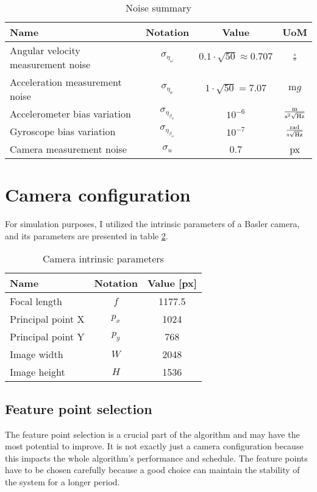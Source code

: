 \begin{table}[!ht]
    \centering
    \begin{tabular}{l|c|c|c}
         Name & Notation & Value & UoM \\ \hline
         Angular velocity measurement noise & $\sigma_{\eta_\omega}$ & $0.1\cdot\sqrt{50}\approx 0.707$ & $\si{\frac{\circ}{\second}}$ \\
         Acceleration measurement noise & $\sigma_{\eta_a}$ & $1\cdot\sqrt{50}=7.07$ & $\si{\milli g}$ \\
         Accelerometer bias variation & $\sigma_{\eta_{\beta_a}}$ & $10^{-6}$ & $\si{\frac{\meter}{\second\squared\sqrt{\hertz}}}$ \\
         Gyroscope bias variation & $\sigma_{\eta_{\beta_\omega}}$ & $10^{-7}$ & $\si{\frac{\radian}{\second\sqrt{\hertz}}}$ \\
         Camera measurement noise & $\sigma_u$ & 0.7 & \si{px}
    \end{tabular}
    \caption{Noise summary}
    \label{tab:noises}
\end{table}

\section{Camera configuration}

For simulation purposes, I utilized the intrinsic parameters of a Basler camera, and its parameters are presented in table \ref{tab:cam-intrinsic}.
\begin{table}[!ht]
    \centering
    \begin{tabular}{l|c|c}
         Name & Notation & Value [px] \\ \hline
         Focal length & $f$ &  1177.5 \\
         Principal point X & $p_x$ & 1024 \\
         Principal point Y & $p_y$ & 768 \\
         Image width & $W$ & 2048 \\
         Image height & $H$ & 1536
    \end{tabular}
    \caption{Camera intrinsic parameters}
    \label{tab:cam-intrinsic}
\end{table}

\subsection{Feature point selection}

The feature point selection is a crucial part of the algorithm and may have the most potential to improve. It is not exactly just a camera configuration because this impacts the whole algorithm's performance and schedule. The feature points have to be chosen carefully because a good choice can maintain the stability of the system for a longer period.

